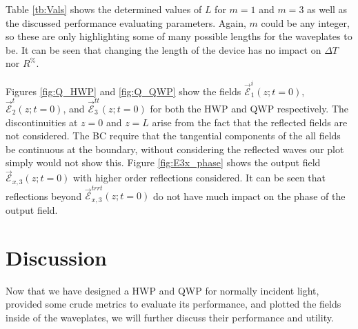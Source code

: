 \documentclass{optica-article}
\begin{document}
Table \ref{tb:Vals} shows the determined values of $L$ for $m=1$ and $m=3$ as 
well as the discussed performance evaluating parameters. Again, $m$ could be
any integer, so these are only highlighting some of many possible lengths for
the waveplates to be. It can be seen that changing the length of the device 
has no impact on $\Delta T$ nor $R^\%$.

Figures \ref{fig:Q_HWP} and \ref{fig:Q_QWP} show the fields 
$\vec{\mathscr{E}}_1^i(z; t = 0)$, $\vec{\mathscr{E}}_2^{t}(z; t = 0)$, and 
$\vec{\mathscr{E}}_3^{tt}(z; t = 0)$ for both the HWP and QWP respectively.
The discontinuities at $z=0$ and $z=L$ arise from the fact that the reflected
fields are not considered. The BC require that the tangential components
of the all fields be continuous at the boundary, without considering the 
reflected waves our plot simply would not show this. Figure \ref{fig:E3x_phase}
shows the output field $\vec{\mathscr{E}}_{x,3}(z; t=0)$ with higher order
reflections considered. It can be seen that reflections beyond 
$\vec{\mathscr{E}}^{trrt}_{x,3}(z; t=0)$ do not have much impact on the 
phase of the output field.



\section{Discussion}
Now that we have designed a HWP and QWP for normally incident light, provided
some crude metrics to evaluate its performance, and plotted the fields inside of
the waveplates, we will further discuss their performance and utility.

\end{document}
